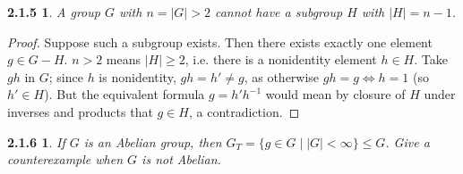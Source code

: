 \documentclass{article}
\newtheorem*{2.1.5}{2.1.5}
\newtheorem*{2.1.6}{2.1.6}
\begin{document}
\begin{2.1.5}
  A group $G$ with $n=|G|>2$ cannot have a subgroup $H$ with $|H| = n-1$.
\end{2.1.5}

\begin{proof}
  Suppose such a subgroup exists.
  Then there exists exactly one element $g\in G-H$.
  $n > 2$ means $|H|\geq 2$, i.e. there is a nonidentity element $h\in H$.
  Take $gh$ in $G$; since $h$ is nonidentity, $gh = h'\neq g$, as otherwise $gh = g\Leftrightarrow h = 1$ (so $h'\in H$).
  But the equivalent formula $g=h'h^{-1}$ would mean by closure of $H$ under inverses and products that $g\in H$, a contradiction.
\end{proof}

\begin{2.1.6}
  If $G$ is an Abelian group, then $G_{T}=\{g\in G\mid |G|< \infty\}\leq G$.
  Give a counterexample when $G$ is not Abelian.
\end{2.1.6}
\end{document}
